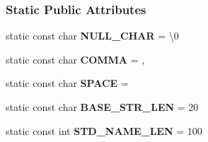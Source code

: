 \subsubsection*{Static Public Attributes}
\begin{DoxyCompactItemize}
\item 
\hypertarget{class_med_type_a38f07d06c9d88f36a9a594c7291fd77e}{}static const char {\bfseries N\+U\+L\+L\+\_\+\+C\+H\+A\+R} = \textquotesingle{}\textbackslash{}0\textquotesingle{}\label{class_med_type_a38f07d06c9d88f36a9a594c7291fd77e}

\item 
\hypertarget{class_med_type_a021af2d83356e85c5723949458c4356f}{}static const char {\bfseries C\+O\+M\+M\+A} = \textquotesingle{},\textquotesingle{}\label{class_med_type_a021af2d83356e85c5723949458c4356f}

\item 
\hypertarget{class_med_type_a2f507a36527d70830b290b5c94ded57a}{}static const char {\bfseries S\+P\+A\+C\+E} = \textquotesingle{} \textquotesingle{}\label{class_med_type_a2f507a36527d70830b290b5c94ded57a}

\item 
\hypertarget{class_med_type_aae3bf1ef6fbc6f157a344efebbd7b6f7}{}static const char {\bfseries B\+A\+S\+E\+\_\+\+S\+T\+R\+\_\+\+L\+E\+N} = 20\label{class_med_type_aae3bf1ef6fbc6f157a344efebbd7b6f7}

\item 
\hypertarget{class_med_type_af2bc2f4e48cce8645bc45e2a3095cf14}{}static const int {\bfseries S\+T\+D\+\_\+\+N\+A\+M\+E\+\_\+\+L\+E\+N} = 100\label{class_med_type_af2bc2f4e48cce8645bc45e2a3095cf14}

\end{DoxyCompactItemize}
